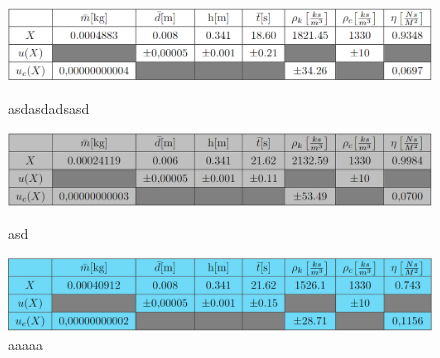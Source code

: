 \documentclass{article}
\begin{document}
\begin{figure}
    \centering
    \includegraphics[scale=0.5]{t_b.png}
    \caption{asdasdadsasd}
    \centering
    \includegraphics[scale=0.5]{t_c.png}
    \caption{asd}
    \centering
    \includegraphics[scale=0.5]{t_n.png}
    \caption{aaaaa}
\end{figure}
\end{document}
